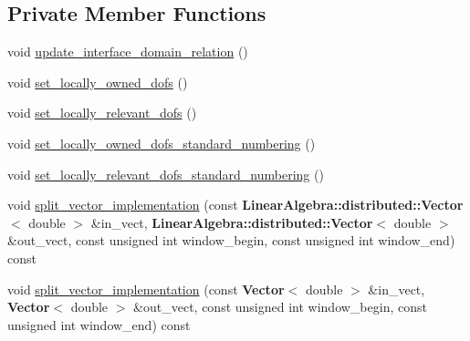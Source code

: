 \subsection*{Private Member Functions}
\begin{DoxyCompactItemize}
\item 
void \hyperlink{class_do_f_handler_system_a237b112398864f03ef97873f276960f5}{update\+\_\+interface\+\_\+domain\+\_\+relation} ()
\item 
void \hyperlink{class_do_f_handler_system_ab24852414baf7b391b67d21644bd66f8}{set\+\_\+locally\+\_\+owned\+\_\+dofs} ()
\item 
void \hyperlink{class_do_f_handler_system_affa92a0bb132688295b748e0c5436d2e}{set\+\_\+locally\+\_\+relevant\+\_\+dofs} ()
\item 
void \hyperlink{class_do_f_handler_system_a56c9cd6d17075c1b7a6d24d5d28357b2}{set\+\_\+locally\+\_\+owned\+\_\+dofs\+\_\+standard\+\_\+numbering} ()
\item 
void \hyperlink{class_do_f_handler_system_a51f57afbe35de6bdd39a979911eaa838}{set\+\_\+locally\+\_\+relevant\+\_\+dofs\+\_\+standard\+\_\+numbering} ()
\item 
void \hyperlink{class_do_f_handler_system_a5f235d3e4fa9dbd19cd541defdbaeacc}{split\+\_\+vector\+\_\+implementation} (const {\bf Linear\+Algebra\+::distributed\+::\+Vector}$<$ double $>$ \&in\+\_\+vect, {\bf Linear\+Algebra\+::distributed\+::\+Vector}$<$ double $>$ \&out\+\_\+vect, const unsigned int window\+\_\+begin, const unsigned int window\+\_\+end) const 
\item 
void \hyperlink{class_do_f_handler_system_a62a1c2f3a805f985203e5e131e9a547b}{split\+\_\+vector\+\_\+implementation} (const {\bf Vector}$<$ double $>$ \&in\+\_\+vect, {\bf Vector}$<$ double $>$ \&out\+\_\+vect, const unsigned int window\+\_\+begin, const unsigned int window\+\_\+end) const 
\end{DoxyCompactItemize}

